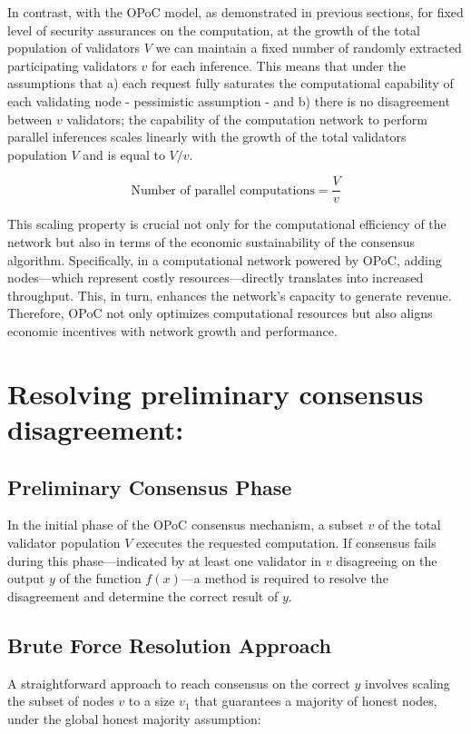 \documentclass{article}
\begin{document}
In contrast, with the OPoC model, as demonstrated in previous sections,  for fixed level of security assurances on the computation, at the growth of the total population of validators \(V\) we can maintain a fixed number of randomly extracted participating validators \(v\) for each inference. This means that under the assumptions that a) each request fully saturates the computational capability of each validating node - pessimistic assumption - and b) there is no disagreement between \(v\) validators; the capability of the computation network to perform parallel inferences scales linearly with the growth of the total validators population \(V\) and is equal to \(V/v\).


\[ \text{Number of parallel computations} = \frac{V}{v} \]




This scaling property is crucial not only for the computational efficiency of the network but also in terms of the economic sustainability of the consensus algorithm. Specifically, in a computational network powered by OPoC, adding nodes—which represent costly resources—directly translates into increased throughput. This, in turn, enhances the network's capacity to generate revenue. Therefore, OPoC not only optimizes computational resources but also aligns economic incentives with network growth and performance.

\section{Resolving preliminary consensus disagreement:
}


\subsection{Preliminary Consensus Phase}

In the initial phase of the OPoC consensus mechanism, a subset \( v \) of the total validator population \( V \) executes the requested computation. If consensus fails during this phase—indicated by at least one validator in \( v \) disagreeing on the output \( y \) of the function \( f(x) \)—a method is required to resolve the disagreement and determine the correct result of \( y \).

\subsection{Brute Force Resolution Approach}

A straightforward approach to reach consensus on the correct \( y \) involves scaling the subset of nodes \( v \) to a size \( v_1 \) that guarantees a majority of honest nodes, under the global honest majority assumption:
\end{document}
